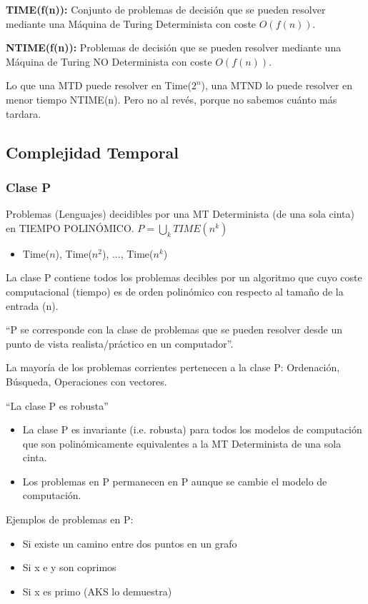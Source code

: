 \textbf{TIME(f(n)):} Conjunto de problemas de decisión que se pueden resolver mediante una Máquina de Turing Determinista con coste $O(f(n))$.

\textbf{NTIME(f(n)):} Problemas de decisión que se pueden resolver mediante una Máquina de Turing NO Determinista con coste $O(f(n))$.

Lo que una MTD puede resolver en Time($2^n$), una MTND  lo puede resolver en menor tiempo NTIME(n). Pero no al revés, porque no sabemos cuánto más tardara.

\subsection{Complejidad Temporal}
\subsubsection{Clase P}
Problemas (Lenguajes) decidibles por una MT Determinista (de una sola cinta) en TIEMPO POLINÓMICO. $P= \bigcup_k TIME(n^k)$
\begin{itemize}
	\item Time($n$), Time($n^2$), ..., Time($n^k$)
\end{itemize}

La clase P contiene todos los problemas decibles por un algoritmo que cuyo coste computacional (tiempo) es de orden polinómico con respecto al tamaño de la entrada (n).

\enquote{P se corresponde con la clase de problemas que se pueden resolver desde un punto de vista realista/práctico en un computador}.

La mayoría de los problemas corrientes pertenecen a la clase P: Ordenación, Búsqueda, Operaciones con vectores.

“La clase P es robusta”
\begin{itemize}
	\item La clase P es invariante (i.e. robusta) para todos los modelos de computación que son polinómicamente equivalentes a la MT Determinista de una sola cinta.
	\item Los problemas en P permanecen en P aunque se cambie el modelo de computación.
\end{itemize}

Ejemplos de problemas en P:
\begin{itemize}
	\item Si existe un camino entre dos puntos en un grafo
	\item Si x e y son coprimos
	\item Si x es primo (AKS lo demuestra)
\end{itemize}

